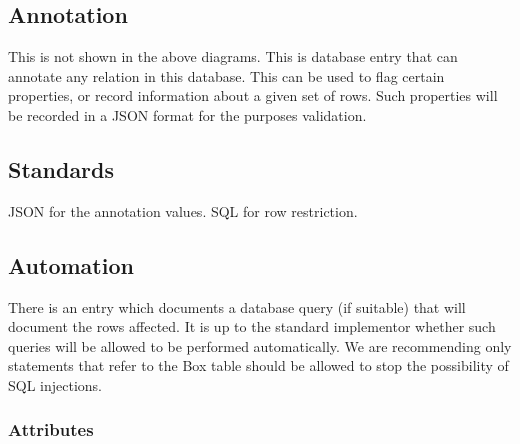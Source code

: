 \subsection{Annotation}\label{annotation}

This is not shown in the above diagrams. This is database entry that can
annotate any relation in this database. This can be used to flag certain
properties, or record information about a given set of rows. Such
properties will be recorded in a JSON format for the purposes
validation.

\subsection{Standards}\label{standards}

JSON for the annotation values. SQL for row restriction.

\subsection{Automation}\label{automation}

There is an entry which documents a database query (if suitable) that
will document the rows affected. It is up to the standard implementor
whether such queries will be allowed to be performed automatically. We
are recommending only statements that refer to the Box table should be
allowed to stop the possibility of SQL injections.

\subsubsection{Attributes}\label{attributes-1}

